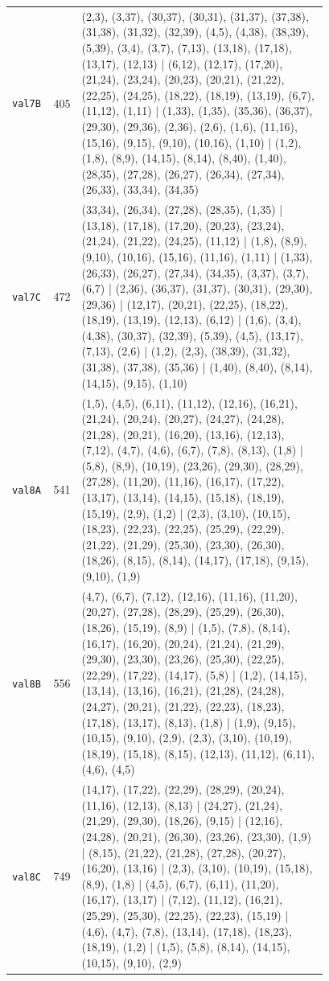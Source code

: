 \begin{landscape}
\begin{longtable}{lr>{\tiny\raggedright\arraybackslash}p{0.78\linewidth}}
\texttt{val7B} & 405 & (2,3), (3,37), (30,37), (30,31), (31,37), (37,38), (31,38), (31,32), (32,39), (4,5), (4,38), (38,39), (5,39), (3,4), (3,7), (7,13), (13,18), (17,18), (13,17), (12,13) | (6,12), (12,17), (17,20), (21,24), (23,24), (20,23), (20,21), (21,22), (22,25), (24,25), (18,22), (18,19), (13,19), (6,7), (11,12), (1,11) | (1,33), (1,35), (35,36), (36,37), (29,30), (29,36), (2,36), (2,6), (1,6), (11,16), (15,16), (9,15), (9,10), (10,16), (1,10) | (1,2), (1,8), (8,9), (14,15), (8,14), (8,40), (1,40), (28,35), (27,28), (26,27), (26,34), (27,34), (26,33), (33,34), (34,35) \\[2pt]
\texttt{val7C} & 472 & (33,34), (26,34), (27,28), (28,35), (1,35) | (13,18), (17,18), (17,20), (20,23), (23,24), (21,24), (21,22), (24,25), (11,12) | (1,8), (8,9), (9,10), (10,16), (15,16), (11,16), (1,11) | (1,33), (26,33), (26,27), (27,34), (34,35), (3,37), (3,7), (6,7) | (2,36), (36,37), (31,37), (30,31), (29,30), (29,36) | (12,17), (20,21), (22,25), (18,22), (18,19), (13,19), (12,13), (6,12) | (1,6), (3,4), (4,38), (30,37), (32,39), (5,39), (4,5), (13,17), (7,13), (2,6) | (1,2), (2,3), (38,39), (31,32), (31,38), (37,38), (35,36) | (1,40), (8,40), (8,14), (14,15), (9,15), (1,10) \\[2pt]
\texttt{val8A} & 541 & (1,5), (4,5), (6,11), (11,12), (12,16), (16,21), (21,24), (20,24), (20,27), (24,27), (24,28), (21,28), (20,21), (16,20), (13,16), (12,13), (7,12), (4,7), (4,6), (6,7), (7,8), (8,13), (1,8) | (5,8), (8,9), (10,19), (23,26), (29,30), (28,29), (27,28), (11,20), (11,16), (16,17), (17,22), (13,17), (13,14), (14,15), (15,18), (18,19), (15,19), (2,9), (1,2) | (2,3), (3,10), (10,15), (18,23), (22,23), (22,25), (25,29), (22,29), (21,22), (21,29), (25,30), (23,30), (26,30), (18,26), (8,15), (8,14), (14,17), (17,18), (9,15), (9,10), (1,9) \\[2pt]
\texttt{val8B} & 556 & (4,7), (6,7), (7,12), (12,16), (11,16), (11,20), (20,27), (27,28), (28,29), (25,29), (26,30), (18,26), (15,19), (8,9) | (1,5), (7,8), (8,14), (16,17), (16,20), (20,24), (21,24), (21,29), (29,30), (23,30), (23,26), (25,30), (22,25), (22,29), (17,22), (14,17), (5,8) | (1,2), (14,15), (13,14), (13,16), (16,21), (21,28), (24,28), (24,27), (20,21), (21,22), (22,23), (18,23), (17,18), (13,17), (8,13), (1,8) | (1,9), (9,15), (10,15), (9,10), (2,9), (2,3), (3,10), (10,19), (18,19), (15,18), (8,15), (12,13), (11,12), (6,11), (4,6), (4,5) \\[2pt]
\texttt{val8C} & 749 & (14,17), (17,22), (22,29), (28,29), (20,24), (11,16), (12,13), (8,13) | (24,27), (21,24), (21,29), (29,30), (18,26), (9,15) | (12,16), (24,28), (20,21), (26,30), (23,26), (23,30), (1,9) | (8,15), (21,22), (21,28), (27,28), (20,27), (16,20), (13,16) | (2,3), (3,10), (10,19), (15,18), (8,9), (1,8) | (4,5), (6,7), (6,11), (11,20), (16,17), (13,17) | (7,12), (11,12), (16,21), (25,29), (25,30), (22,25), (22,23), (15,19) | (4,6), (4,7), (7,8), (13,14), (17,18), (18,23), (18,19), (1,2) | (1,5), (5,8), (8,14), (14,15), (10,15), (9,10), (2,9) \\[2pt]

\end{longtable}
\end{landscape}
